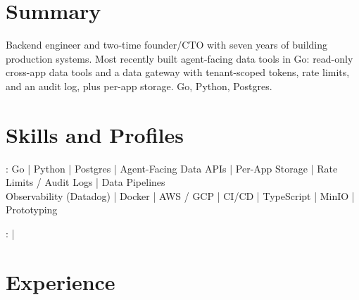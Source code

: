 \documentclass[print]{jack-resume}
\begin{document}
\pagecolor{darkmodeBackground}


\begin{minipage}[t][1cm][t]{.03\textwidth}
    \hfill
\end{minipage}

\section{Summary}
Backend engineer and two-time founder/CTO with seven years of building production systems. Most recently built agent-facing data tools in Go: read-only cross-app data tools and a data gateway with tenant-scoped tokens, rate limits, and an audit log, plus per-app storage. Go, Python, Postgres.
\sectionsep

\section{Skills and Profiles}
:
Go \hfill | \hfill
Python \hfill | \hfill
Postgres \hfill | \hfill
Agent-Facing Data APIs \hfill | \hfill
Per-App Storage \hfill | \hfill
Rate Limits / Audit Logs \hfill | \hfill
Data Pipelines \\
\hspace{1.0cm} Observability (Datadog) \hfill | \hfill
Docker \hfill | \hfill
AWS / GCP \hfill | \hfill
CI/CD \hfill | \hfill
TypeScript \hfill | \hfill
MinIO \hfill | \hfill
Prototyping \\

\raggedright{
    :
      \href{https://www.linkedin.com/in/jack-sturtevant/}{ \ExternalLink} |
     \href{https://github.com/jacksturt}{ \ExternalLink}}

\section{Experience}
\end{document}
